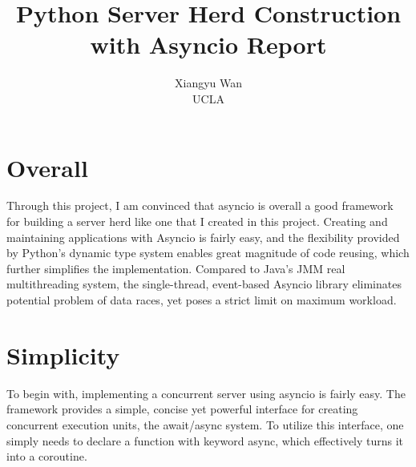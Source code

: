 \documentclass[letterpaper,twocolumn,10pt]{article}
\begin{document}

\date{}

\title{\Large \bf Python Server Herd Construction with Asyncio Report}

\author{
{\rm Xiangyu Wan}\\
UCLA
} %

\maketitle


\section{Overall}

Through this project, I am convinced that asyncio is overall a good framework for building a server herd like one that I created in this project.
Creating and maintaining applications with Asyncio is fairly easy, and the flexibility provided by Python's dynamic type system enables great magnitude of code reusing, which further simplifies the implementation.
Compared to Java's JMM real multithreading system, the single-thread, event-based Asyncio library eliminates potential problem of data races, yet poses a strict limit on maximum workload.

\section{Simplicity}

To begin with, implementing a concurrent server using asyncio is fairly easy. 
The framework provides a simple, concise yet powerful interface for creating concurrent execution units, the await/async system. 
To utilize this interface, one simply needs to declare a function with keyword async, which effectively turns it into a coroutine. 
\end{document}
